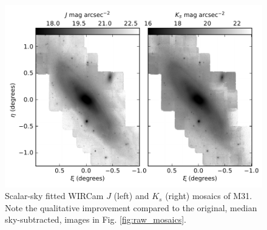 \documentclass[iop]{emulateapj}
\begin{document}
\begin{figure}[t]
	\centering
		\includegraphics[width=6in]{figs/scalar_mosaics}
	\caption{Scalar-sky fitted WIRCam $J$ (left) and $K_s$ (right) mosaics of M31. Note the qualitative improvement compared to the original, median sky-subtracted, images in Fig. \ref{fig:raw_mosaics}.}
	\label{fig:scalar_mosaics}
\end{figure}
\end{document}
